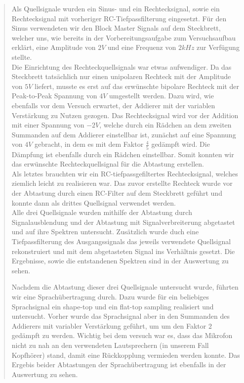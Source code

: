 \begin{quote}
         Als Quellsignale wurden ein Sinus- und ein Rechtecksignal, sowie ein
         Rechtecksignal mit vorheriger RC-Tiefpassfilterung eingesetzt. Für den
         Sinus verwendeten wir den Block Master Signals auf dem Steckbrett, welcher uns, wie
         bereits in der Vorbereitungsaufgabe zum Versuchsaufbau erklärt, eine
         Amplitude von $2V$ und eine Frequenz von $2 kHz$ zur Verfügung
         stellte.\\
         Die Einrichtung des Rechteckquellsignals war etwas aufwendiger. Da das
         Steckbrett tatsächlich nur einen unipolaren Rechteck mit der Amplitude
         von $5V$ liefert, musste es erst auf das erwünschte bipolare Rechteck
         mit der Peak-to-Peak Spannung von $4V$ umgestellt werden. Dazu wird,
         wie ebenfalls vor dem Versuch erwartet, der Addierer mit der variablen
         Verstärkung zu Nutzen gezogen. Das Rechtecksignal wird vor der Addition
         mit einer Spannung von $-2V$, welche durch ein Rädchen an dem
         zweiten Summanden auf dem Addierer einstellbar ist, zunächst auf eine
         Spannung von $4V$ gebracht, in dem es mit dem Faktor $\frac{4}{5}$ gedämpft wird. 
         Die Dämpfung ist ebenfalls durch ein Rädchen einstellbar. Somit konnten
         wir das erwünschte Rechteckquellsignal für die Abtastung erstellen.\\
         Als letztes brauchten wir ein RC-tiefpassgefiltertes Rechtecksignal,
         welches ziemlich leicht zu realisieren war. Das zuvor erstellte
         Rechteck wurde vor der Abtastung durch einen RC-Filter auf dem
         Steckbrett geführt und konnte dann als drittes Quellsignal verwendet
         werden.\\
         
         Alle drei Quellsignale wurden mithilfe der Abtastung durch Signalausblendung und
         der Abtastung mit Signalverbreiterung abgetastet und auf ihre Spektren
         untersucht. Zusätzlich wurde duch eine Tiefpassfilterung des
         Ausgangssignals das jeweils verwendete Quellsignal rekonstruiert und
         mit dem abgetasteten Signal ins Verhältnis gesetzt. Die Ergebnisse,
         sowie die entstandenen Spektren sind in der Auswertung zu sehen.
         
         \vspace{1em}
         
         Nachdem die Abtastung dieser drei Quellsignale untersucht wurde,
         führten wir eine Sprachübertragung durch. Dazu wurde für ein beliebiges
         Sprachsignal ein shape-top und ein flat-top sampling realisiert und
         untersucht. Vorher wurde das Sprachsignal aber in den Summanden des
         Addierers mit variabler Verstärkung geführt, um um den Faktor $2$
         gedämpft zu werden. Wichtig bei dem versuch war es, dass das Mikrofon
         nicht zu nah an den verwendeten Lautsprechern (in unserem Fall
         Kopfhörer) stand, damit eine Rückkopplung vermieden werden konnte.
         Das Ergebis beider Abtastungen der Sprachübertragung ist ebenfalls in
         der Auswertung zu sehen.
         
   	\end{quote}%

